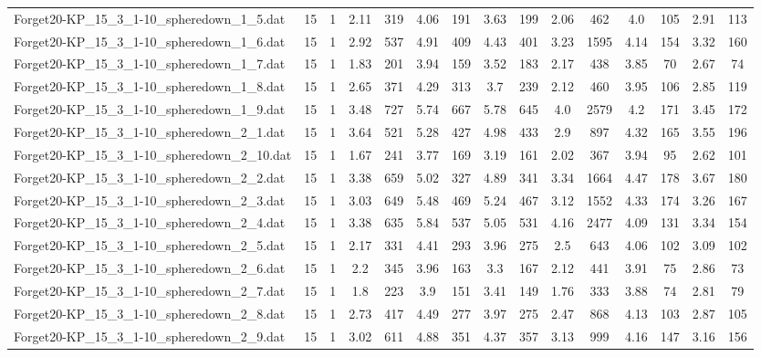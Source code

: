 \begin{table}[!ht]
{\begin{tabular}{lcccccccccccccc}
Forget20-KP\_15\_3\_1-10\_spheredown\_1\_5.dat & 15 & 1 & 2.11 & 319 & 4.06 & 191 & 3.63 & 199 & 2.06 & 462 & 4.0 & 105 & 2.91 & 113 \\
Forget20-KP\_15\_3\_1-10\_spheredown\_1\_6.dat & 15 & 1 & 2.92 & 537 & 4.91 & 409 & 4.43 & 401 & 3.23 & 1595 & 4.14 & 154 & 3.32 & 160 \\
Forget20-KP\_15\_3\_1-10\_spheredown\_1\_7.dat & 15 & 1 & 1.83 & 201 & 3.94 & 159 & 3.52 & 183 & 2.17 & 438 & 3.85 & 70 & 2.67 & 74 \\
Forget20-KP\_15\_3\_1-10\_spheredown\_1\_8.dat & 15 & 1 & 2.65 & 371 & 4.29 & 313 & 3.7 & 239 & 2.12 & 460 & 3.95 & 106 & 2.85 & 119 \\
Forget20-KP\_15\_3\_1-10\_spheredown\_1\_9.dat & 15 & 1 & 3.48 & 727 & 5.74 & 667 & 5.78 & 645 & 4.0 & 2579 & 4.2 & 171 & 3.45 & 172 \\
Forget20-KP\_15\_3\_1-10\_spheredown\_2\_1.dat & 15 & 1 & 3.64 & 521 & 5.28 & 427 & 4.98 & 433 & 2.9 & 897 & 4.32 & 165 & 3.55 & 196 \\
Forget20-KP\_15\_3\_1-10\_spheredown\_2\_10.dat & 15 & 1 & 1.67 & 241 & 3.77 & 169 & 3.19 & 161 & 2.02 & 367 & 3.94 & 95 & 2.62 & 101 \\
Forget20-KP\_15\_3\_1-10\_spheredown\_2\_2.dat & 15 & 1 & 3.38 & 659 & 5.02 & 327 & 4.89 & 341 & 3.34 & 1664 & 4.47 & 178 & 3.67 & 180 \\
Forget20-KP\_15\_3\_1-10\_spheredown\_2\_3.dat & 15 & 1 & 3.03 & 649 & 5.48 & 469 & 5.24 & 467 & 3.12 & 1552 & 4.33 & 174 & 3.26 & 167 \\
Forget20-KP\_15\_3\_1-10\_spheredown\_2\_4.dat & 15 & 1 & 3.38 & 635 & 5.84 & 537 & 5.05 & 531 & 4.16 & 2477 & 4.09 & 131 & 3.34 & 154 \\
Forget20-KP\_15\_3\_1-10\_spheredown\_2\_5.dat & 15 & 1 & 2.17 & 331 & 4.41 & 293 & 3.96 & 275 & 2.5 & 643 & 4.06 & 102 & 3.09 & 102 \\
Forget20-KP\_15\_3\_1-10\_spheredown\_2\_6.dat & 15 & 1 & 2.2 & 345 & 3.96 & 163 & 3.3 & 167 & 2.12 & 441 & 3.91 & 75 & 2.86 & 73 \\
Forget20-KP\_15\_3\_1-10\_spheredown\_2\_7.dat & 15 & 1 & 1.8 & 223 & 3.9 & 151 & 3.41 & 149 & 1.76 & 333 & 3.88 & 74 & 2.81 & 79 \\
Forget20-KP\_15\_3\_1-10\_spheredown\_2\_8.dat & 15 & 1 & 2.73 & 417 & 4.49 & 277 & 3.97 & 275 & 2.47 & 868 & 4.13 & 103 & 2.87 & 105 \\
Forget20-KP\_15\_3\_1-10\_spheredown\_2\_9.dat & 15 & 1 & 3.02 & 611 & 4.88 & 351 & 4.37 & 357 & 3.13 & 999 & 4.16 & 147 & 3.16 & 156 \\

\end{tabular}}
\end{table}
